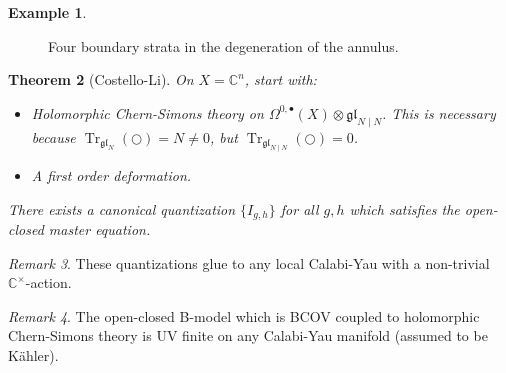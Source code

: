 \documentclass{amsart}
\newtheorem{thm}{Theorem}[section]
\theoremstyle{definition}
\newtheorem{exm}[thm]{Example}
\theoremstyle{remark}
\newtheorem{rmk}[thm]{Remark}
\theoremstyle{plain}
\theoremstyle{definition}
\theoremstyle{remark}
\newcommand{\C}{\mathbb{C}}
\newcommand{\mf}[1]{\mathfrak{#1}}
\newcommand{\on}[1]{\operatorname{#1}}
\newcommand{\1}{\mathbf{1}}
\newcommand{\2}{\mathbf{2}}
\newcommand{\3}{\mathbf{3}}
\begin{document}
\begin{exm}
\begin{figure}[htpb]
\caption{Four boundary strata in the degeneration of the annulus.}
\label{fig:annulus-four-degenerations}
\end{figure}
\end{exm}

\begin{thm}[Costello-Li]
    On \(X = \C^n\), start with:
    \begin{itemize}
        \item Holomorphic Chern-Simons theory on \( \Omega^{0, \bullet}(X) \otimes \mf{gl}_{N\mid N}\). This is necessary because \(\on{Tr}_{\mf{gl}_N}(\bigcirc) = N \neq 0\), but \(\on{Tr}_{\mf{gl}_{N \mid N}}(\bigcirc) = 0\).
        \item A first order deformation.
    \end{itemize}
    There exists a canonical quantization \( \{ I_{g,h} \}\) for all \(g,h\) which satisfies the open-closed master equation.
\end{thm}

\begin{rmk}
    These quantizations glue to any local Calabi-Yau with a non-trivial \(\C^{\times}\)-action.
\end{rmk}

\begin{rmk}
    The open-closed B-model which is BCOV coupled to holomorphic Chern-Simons theory is UV finite on any Calabi-Yau manifold (assumed to be K\"ahler).
\end{rmk}
\end{document}
